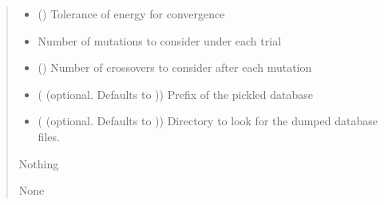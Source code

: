 \documentclass[letterpaper,10pt,english]{sphinxmanual}
\begin{document}
\begin{fulllineitems}
\begin{quote}
\begin{description}
\begin{itemize}
\item {} 
\sphinxAtStartPar
{} () \textendash{} Tolerance of energy for convergence

\item {} 
\sphinxAtStartPar
{} \textendash{} Number of mutations to consider under each trial

\item {} 
\sphinxAtStartPar
{} () \textendash{} Number of crossovers to consider after each mutation

\item {} 
\sphinxAtStartPar
{} ( (optional. Defaults to )) \textendash{} Prefix of the pickled database

\item {} 
\sphinxAtStartPar
{} ( (optional. Defaults to )) \textendash{} Directory to look for the dumped database files.

\end{itemize}

\sphinxAtStartPar
Nothing

\sphinxAtStartPar
None

\end{description}\end{quote}

\begin{sphinxVerbatim}[commandchars=\\\{\}]
  
  
           
\end{sphinxVerbatim}

\end{fulllineitems}
\end{document}
